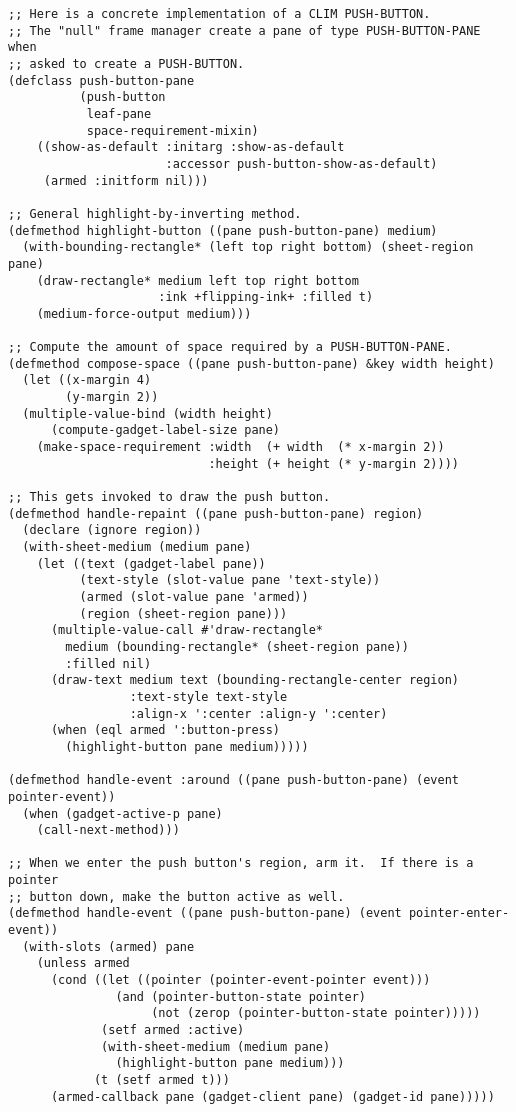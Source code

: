 \begin{verbatim}
;; Here is a concrete implementation of a CLIM PUSH-BUTTON.
;; The "null" frame manager create a pane of type PUSH-BUTTON-PANE when
;; asked to create a PUSH-BUTTON.
(defclass push-button-pane
          (push-button
           leaf-pane
           space-requirement-mixin)
    ((show-as-default :initarg :show-as-default
                      :accessor push-button-show-as-default)
     (armed :initform nil)))

;; General highlight-by-inverting method.
(defmethod highlight-button ((pane push-button-pane) medium)
  (with-bounding-rectangle* (left top right bottom) (sheet-region pane)
    (draw-rectangle* medium left top right bottom
                     :ink +flipping-ink+ :filled t)
    (medium-force-output medium)))

;; Compute the amount of space required by a PUSH-BUTTON-PANE.
(defmethod compose-space ((pane push-button-pane) &key width height)
  (let ((x-margin 4)
        (y-margin 2))
  (multiple-value-bind (width height)
      (compute-gadget-label-size pane)
    (make-space-requirement :width  (+ width  (* x-margin 2))
                            :height (+ height (* y-margin 2))))

;; This gets invoked to draw the push button.
(defmethod handle-repaint ((pane push-button-pane) region)
  (declare (ignore region))
  (with-sheet-medium (medium pane)
    (let ((text (gadget-label pane))
          (text-style (slot-value pane 'text-style))
          (armed (slot-value pane 'armed))
          (region (sheet-region pane)))
      (multiple-value-call #'draw-rectangle*
        medium (bounding-rectangle* (sheet-region pane))
        :filled nil)
      (draw-text medium text (bounding-rectangle-center region)
                 :text-style text-style
                 :align-x ':center :align-y ':center)
      (when (eql armed ':button-press)
        (highlight-button pane medium)))))

(defmethod handle-event :around ((pane push-button-pane) (event pointer-event))
  (when (gadget-active-p pane)
    (call-next-method)))

;; When we enter the push button's region, arm it.  If there is a pointer
;; button down, make the button active as well.
(defmethod handle-event ((pane push-button-pane) (event pointer-enter-event))
  (with-slots (armed) pane
    (unless armed
      (cond ((let ((pointer (pointer-event-pointer event)))
               (and (pointer-button-state pointer)
                    (not (zerop (pointer-button-state pointer)))))
             (setf armed :active)
             (with-sheet-medium (medium pane)
               (highlight-button pane medium)))
            (t (setf armed t)))
      (armed-callback pane (gadget-client pane) (gadget-id pane)))))


\end{verbatim}
